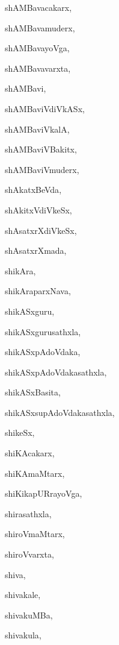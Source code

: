 \begin{multicols}{2}
{shAMBavacakarx}, \pageref{shAMBavacakarx}

{shAMBavamuderx}, \pageref{shAMBavamuderx}

{shAMBavayoVga}, \pageref{shAMBavayoVga}

{shAMBavavarxta}, \pageref{shAMBavavarxta}

{shAMBavi}, \pageref{shAMBavi}

{shAMBaviVdiVkASx}, \pageref{shAMBaviVdiVkASx}

{shAMBaviVkalA}, \pageref{shAMBaviVkalA}

{shAMBaviVBakitx}, \pageref{shAMBaviVBakitx}

{shAMBaviVmuderx}, \pageref{shAMBaviVmuderx}

{shAkatxBeVda}, \pageref{shAkatxBeVda}

{shAkitxVdiVkeSx}, \pageref{shAkitxVdiVkeSx}

{shAsatxrXdiVkeSx}, \pageref{shAsatxrXdiVkeSx}

{shAsatxrXmada}, \pageref{shAsatxrXmada}

{shikAra}, \pageref{shikAra}

{shikAraparxNava}, \pageref{shikAraparxNava}

{shikASxguru}, \pageref{shikASxguru}

{shikASxgurusathxla}, \pageref{shikASxgurusathxla}

{shikASxpAdoVdaka}, \pageref{shikASxpAdoVdaka}

{shikASxpAdoVdakasathxla}, \pageref{shikASxpAdoVdakasathxla}

{shikASxBasita}, \pageref{shikASxBasita}

{shikASxsupAdoVdakasathxla}, \pageref{shikASxsupAdoVdakasathxla}

{shikeSx}, \pageref{shikeSx}

{shiKAcakarx}, \pageref{shiKAcakarx}

{shiKAmaMtarx}, \pageref{shiKAmaMtarx}

{shiKikapURrayoVga}, \pageref{shiKikapURrayoVga}

{shirasathxla}, \pageref{shirasathxla}

{shiroVmaMtarx}, \pageref{shiroVmaMtarx}

{shiroVvarxta}, \pageref{shiroVvarxta}

{shiva}, \pageref{shiva}

{shivakale}, \pageref{shivakale}

{shivakuMBa}, \pageref{shivakuMBa}

{shivakula}, \pageref{shivakula}


\end{multicols}
